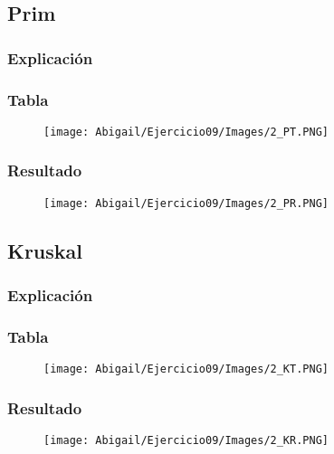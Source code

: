 \documentclass[12pt]{article}
\begin{document}
    \subsection{Prim}

      \subsubsection{Explicación}

      \subsubsection{Tabla}
        \begin{figure}[h!]
          \centering
          \texttt{[image: Abigail/Ejercicio09/Images/2\_PT.PNG]}
        \end{figure} 

      \subsubsection{Resultado}
        \begin{figure}[h!]
          \centering
          \texttt{[image: Abigail/Ejercicio09/Images/2\_PR.PNG]}
        \end{figure} 

    \subsection{Kruskal}

      \subsubsection{Explicación}

      \subsubsection{Tabla}
        \begin{figure}[h!]
          \centering
          \texttt{[image: Abigail/Ejercicio09/Images/2\_KT.PNG]}
        \end{figure} 

      \subsubsection{Resultado}

        \begin{figure}[h!]
          \centering
          \texttt{[image: Abigail/Ejercicio09/Images/2\_KR.PNG]}
        \end{figure} 
\end{document}

